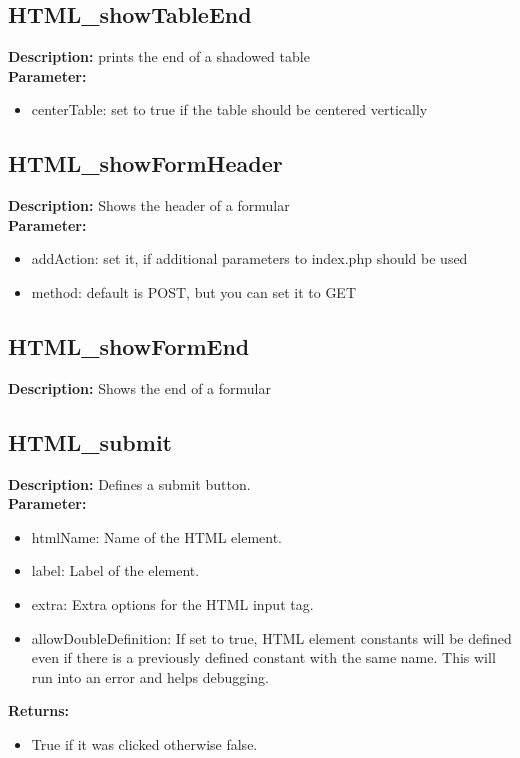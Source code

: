 \subsection{HTML\_showTableEnd}
\textbf{Description:} prints the end of a shadowed table\\
\textbf{Parameter:}
\begin{itemize}
\item centerTable: set to true if the table should be centered vertically
\end{itemize}

\subsection{HTML\_showFormHeader}
\textbf{Description:} Shows the header of a formular\\
\textbf{Parameter:}
\begin{itemize}
\item addAction: set it, if additional parameters to index.php should be used
\item method: default is POST, but you can set it to GET
\end{itemize}

\subsection{HTML\_showFormEnd}
\textbf{Description:} Shows the end of a formular\\

\subsection{HTML\_submit}
\textbf{Description:} Defines a submit button.\\
\textbf{Parameter:}
\begin{itemize}
\item htmlName: Name of the HTML element.
\item label: Label of the element.
\item extra: Extra options for the HTML input tag.
\item allowDoubleDefinition: If set to true, HTML element constants will be defined even if there is a previously defined constant with the same name. This will run into an error and helps debugging.
\end{itemize}
\textbf{Returns:}
\begin{itemize}
\item True if it was clicked otherwise false.
\end{itemize}

